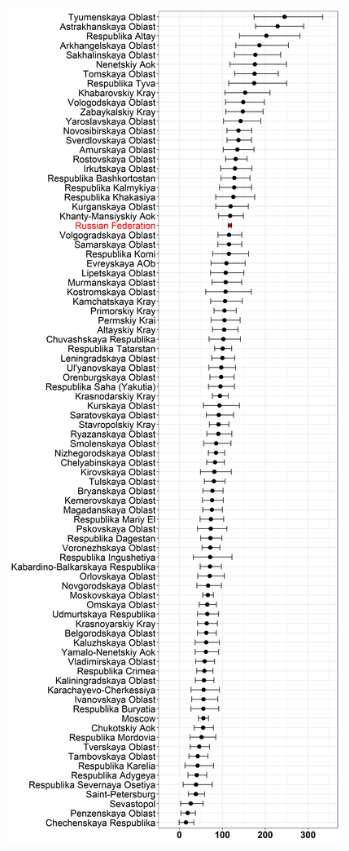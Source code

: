 \documentclass[12pt,a4paper]{article}
\numberwithin{equation}{section}
\begin{document}
\begin{figure}[htp]
	\begin{minipage}[b]{.5\linewidth}
		\centering
		\hspace*{-0.4in}
		\includegraphics[width=250pt]{reg_he_18.png}
		\label{}
	\end{minipage}
	\hfill
	\begin{minipage}[b]{.5\linewidth}
		\centering
		\hspace*{-0.2in}

\end{minipage}
\end{figure}
\end{document}
